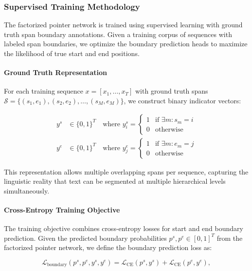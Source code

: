 \subsubsection{Supervised Training Methodology}
\label{sec:span-predictor-training}

The factorized pointer network is trained using supervised learning with ground truth span boundary annotations. Given a training corpus of sequences with labeled span boundaries, we optimize the boundary prediction heads to maximize the likelihood of true start and end positions.

\paragraph{Ground Truth Representation}

For each training sequence \(x = [x_1, \ldots, x_T]\) with ground truth spans \(\mathcal{S} = \{(s_1, e_1), (s_2, e_2), \ldots, (s_M, e_M)\}\), we construct binary indicator vectors:

\begin{align}
y^s &\in \{0,1\}^T \quad \text{where } y^s_i = \begin{cases} 
1 & \text{if } \exists m : s_m = i \\
0 & \text{otherwise}
\end{cases} \label{eq:start-targets} \\
y^e &\in \{0,1\}^T \quad \text{where } y^e_j = \begin{cases} 
1 & \text{if } \exists m : e_m = j \\
0 & \text{otherwise}
\end{cases} \label{eq:end-targets}
\end{align}

This representation allows multiple overlapping spans per sequence, capturing the linguistic reality that text can be segmented at multiple hierarchical levels simultaneously.

\paragraph{Cross-Entropy Training Objective}

The training objective combines cross-entropy losses for start and end boundary prediction. Given the predicted boundary probabilities \(p^s, p^e \in [0,1]^T\) from the factorized pointer network, we define the boundary prediction loss as:

\begin{equation}
\mathcal{L}_{\text{boundary}}(p^s, p^e, y^s, y^e) = \mathcal{L}_{\text{CE}}(p^s, y^s) + \mathcal{L}_{\text{CE}}(p^e, y^e),
\label{eq:boundary-loss}
\end{equation}

